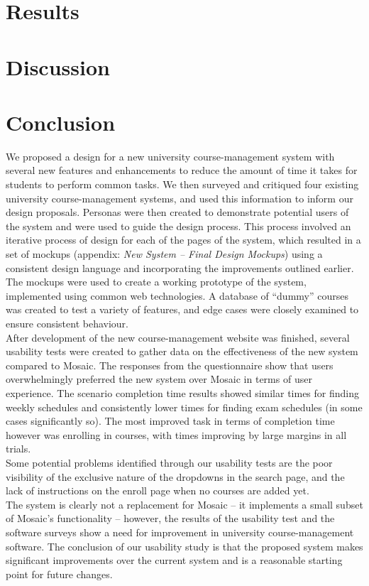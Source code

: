 \documentclass[10pt]{article}
\begin{document}
\begin{multicols}{2}
\section*{Results}
\section*{Discussion}
\section*{Conclusion}
We proposed a design for a new university course-management system with several new features and enhancements to reduce the amount of time it takes for students to perform common tasks. We then surveyed and critiqued four existing university course-management systems, and used this information to inform our design proposals. Personas were then created to demonstrate potential users of the system and were used to guide the design process. This process involved an iterative process of design for each of the pages of the system, which resulted in a set of mockups (appendix: \emph{New System -- Final Design Mockups}) using a consistent design language and incorporating the improvements outlined earlier.\\

The mockups were used to create a working prototype of the system, implemented using common web technologies. A database of ``dummy'' courses was created to test a variety of features, and edge cases were closely examined to ensure consistent behaviour.\\

After development of the new course-management website was finished, several usability tests were created to gather data on the effectiveness of the new system compared to Mosaic. The responses from the questionnaire show that users overwhelmingly preferred the new system over Mosaic in terms of user experience. The scenario completion time results showed similar times for finding weekly schedules and consistently lower times for finding exam schedules (in some cases significantly so). The most improved task in terms of completion time however was enrolling in courses, with times improving by large margins in all trials.\\

Some potential problems identified through our usability tests are the poor visibility of the exclusive nature of the dropdowns in the search page, and the lack of instructions on the enroll page when no courses are added yet.\\

The system is clearly not a replacement for Mosaic -- it implements a small subset of Mosaic's functionality -- however, the results of the usability test and the software surveys show a need for improvement in university course-management software. The conclusion of our usability study is that the proposed system makes significant improvements over the current system and is a reasonable starting point for future changes.

\end{multicols}
\end{document}
